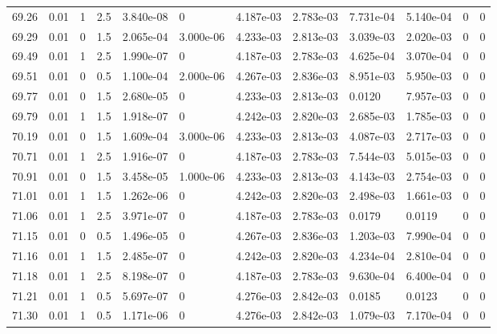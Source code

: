 \documentclass[preview]{standalone}
\begin{document}
{{{{{{{{{{\begin{tabular}{L{1.2cm}C{1.2cm} C{0.3cm}C{0.5cm} C{1.4cm}C{1.4cm} C{1.4cm}C{1.4cm} C{1.6cm}C{1.6cm} C{1.6cm}C{1.6cm}}
  69.26  &  0.01  & 1     & 2.5 &  3.840e-08  & 0  &  4.187e-03&   2.783e-03& 7.731e-04 & 5.140e-04   &  0 & 0  \\ 
  69.29  &  0.01  & 0     & 1.5 &  2.065e-04  & 3.000e-06  &  4.233e-03&   2.813e-03& 3.039e-03 & 2.020e-03   &  0 & 0  \\ 
  69.49  &  0.01  & 1     & 2.5 &  1.990e-07  & 0  &  4.187e-03&   2.783e-03& 4.625e-04 & 3.070e-04   &  0 & 0  \\ 
  69.51  &  0.01  & 0     & 0.5 &  1.100e-04  & 2.000e-06  &  4.267e-03&   2.836e-03& 8.951e-03 & 5.950e-03   &  0 & 0  \\ 
  69.77  &  0.01  & 0     & 1.5 &  2.680e-05  & 0  &  4.233e-03&   2.813e-03& 0.0120 & 7.957e-03   &  0 & 0  \\ 
  69.79  &  0.01  & 1     & 1.5 &  1.918e-07  & 0  &  4.242e-03&   2.820e-03& 2.685e-03 & 1.785e-03   &  0 & 0  \\ 
  70.19  &  0.01  & 0     & 1.5 &  1.609e-04  & 3.000e-06  &  4.233e-03&   2.813e-03& 4.087e-03 & 2.717e-03   &  0 & 0  \\ 
  70.71  &  0.01  & 1     & 2.5 &  1.916e-07  & 0  &  4.187e-03&   2.783e-03& 7.544e-03 & 5.015e-03   &  0 & 0  \\ 
  70.91  &  0.01  & 0     & 1.5 &  3.458e-05  & 1.000e-06  &  4.233e-03&   2.813e-03& 4.143e-03 & 2.754e-03   &  0 & 0  \\ 
  71.01  &  0.01  & 1     & 1.5 &  1.262e-06  & 0  &  4.242e-03&   2.820e-03& 2.498e-03 & 1.661e-03   &  0 & 0  \\ 
  71.06  &  0.01  & 1     & 2.5 &  3.971e-07  & 0  &  4.187e-03&   2.783e-03& 0.0179 & 0.0119   &  0 & 0  \\ 
  71.15  &  0.01  & 0     & 0.5 &  1.496e-05  & 0  &  4.267e-03&   2.836e-03& 1.203e-03 & 7.990e-04   &  0 & 0  \\ 
  71.16  &  0.01  & 1     & 1.5 &  2.485e-07  & 0  &  4.242e-03&   2.820e-03& 4.234e-04 & 2.810e-04   &  0 & 0  \\ 
  71.18  &  0.01  & 1     & 2.5 &  8.198e-07  & 0  &  4.187e-03&   2.783e-03& 9.630e-04 & 6.400e-04   &  0 & 0  \\ 
  71.21  &  0.01  & 1     & 0.5 &  5.697e-07  & 0  &  4.276e-03&   2.842e-03& 0.0185 & 0.0123   &  0 & 0  \\ 
  71.30  &  0.01  & 1     & 0.5 &  1.171e-06  & 0  &  4.276e-03&   2.842e-03& 1.079e-03 & 7.170e-04   &  0 & 0  \\ 
\hline 
\end{tabular} 

}}}}}}}}}}
\end{document}
